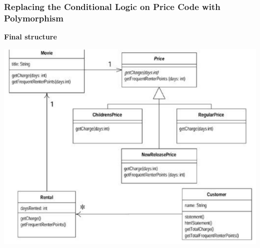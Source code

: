 \documentclass{beamer}
\begin{document}
\begin{frame}
  \frametitle{Replacing the Conditional Logic on Price Code with Polymorphism}
  \textbf{Final structure}
  	\begin{center}
		\includegraphics[scale=0.3]{final}
	\end{center}
\end{frame}
\end{document}
